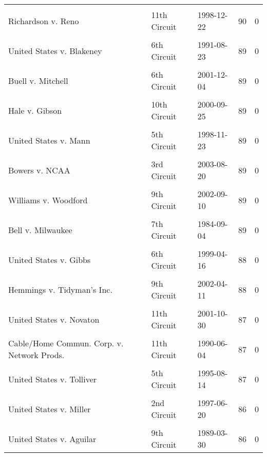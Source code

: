 \documentclass[10pt, letterpaper]{article}
\begin{document}
\begin{spacing}{1.0}
\begin{footnotesize}
\begin{longtable}[H]{p{3.5in}llrr}
        & & & &\\[-6pt]
        Richardson v. Reno & 11th Circuit & 1998-12-22 & 90 & 0\\
        & & & &\\[-6pt]
        United States v. Blakeney & 6th Circuit & 1991-08-23 & 89 & 0\\
        & & & &\\[-6pt]
        Buell v. Mitchell & 6th Circuit & 2001-12-04 & 89 & 0\\
        & & & &\\[-6pt]
        Hale v. Gibson & 10th Circuit & 2000-09-25 & 89 & 0\\
        & & & &\\[-6pt]
        United States v. Mann & 5th Circuit & 1998-11-23 & 89 & 0\\
        & & & &\\[-6pt]
        Bowers v. NCAA & 3rd Circuit & 2003-08-20 & 89 & 0\\
        & & & &\\[-6pt]
        Williams v. Woodford & 9th Circuit & 2002-09-10 & 89 & 0\\
        & & & &\\[-6pt]
        Bell v. Milwaukee & 7th Circuit & 1984-09-04 & 89 & 0\\
        & & & &\\[-6pt]
        United States v. Gibbs & 6th Circuit & 1999-04-16 & 88 & 0\\
        & & & &\\[-6pt]
        Hemmings v. Tidyman's Inc. & 9th Circuit & 2002-04-11 & 88 & 0\\
        & & & &\\[-6pt]
        United States v. Novaton & 11th Circuit & 2001-10-30 & 87 & 0\\
        & & & &\\[-6pt]
        Cable/Home Commun. Corp. v. Network Prods. & 11th Circuit & 1990-06-04 & 87 & 0\\
        & & & &\\[-6pt]
        United States v. Tolliver & 5th Circuit & 1995-08-14 & 87 & 0\\
        & & & &\\[-6pt]
        United States v. Miller & 2nd Circuit & 1997-06-20 & 86 & 0\\
        & & & &\\[-6pt]
        United States v. Aguilar & 9th Circuit & 1989-03-30 & 86 & 0\\

\end{longtable}
\end{footnotesize}
\end{spacing}
\end{document}
